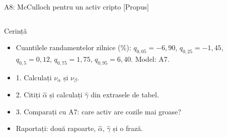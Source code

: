 \begin{frame}{A8: McCulloch pentru un activ cripto [Propus]}
\propsub
\itemsize{\scriptsize}
\begin{columns}[T]
\begin{column}{\taskw}
\begin{block}{Cerință}
\begin{itemize}
    \item Cuantilele randamentelor zilnice (\%): $q_{0{,}05} = -6{,}90$, $q_{0{,}25} = -1{,}45$, $q_{0{,}5} = 0{,}12$, $q_{0{,}75} = 1{,}75$, $q_{0{,}95} = 6{,}40$. Model: A7.
    \item 1. Calculați $\nu_\alpha$ și $\nu_\beta$.
    \item 2. Citiți $\hat\alpha$ și calculați $\hat\gamma$ din extrasele de tabel.
    \item 3. Comparați cu A7: care activ are cozile mai groase?
    \item Raportați: două rapoarte, $\hat\alpha$, $\hat\gamma$ și o frază.
\end{itemize}
\end{block}
\end{column}
\begin{column}{\solw}
\end{column}
\end{columns}
\end{frame}

